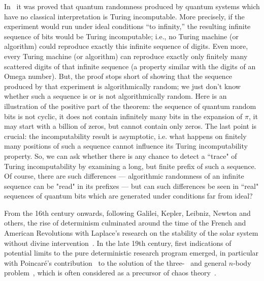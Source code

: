 \documentclass[10pt]{article}%
\begin{document}
In~\cite{2008-cal-svo} it was proved that quantum randomness produced by quantum
systems which have no classical interpretation is Turing
incomputable. More precisely, if the experiment would run under ideal
conditions ``to infinity,'' the resulting infinite sequence of bits would be
Turing incomputable; i.e., no Turing machine (or algorithm) could
reproduce exactly this infinite sequence of digits.
Even more,  every Turing machine (or algorithm) can reproduce exactly
only finitely many scattered digits of that infinite sequence (a
property similar with the digits of an Omega number). But, the
proof stops short of showing that the sequence produced by that
experiment is algorithmically random; we just don't know whether such
a sequence is or is not algorithmically random. Here is an
illustration of the positive part of the theorem: the sequence of
quantum random bits is not cyclic, it does not contain infinitely
many bits in the expansion of $\pi$, it may start with a billion of
zeros, but cannot contain only zeros.
The last point is crucial: the incomputability result is asymptotic, i.e. what happens on finitely many
positions of such a sequence cannot influence its Turing
incomputability property. So, we can ask whether there is any chance
to detect a ``trace" of Turing incomputability by examining a long,
but finite prefix of such a sequence.
Of course,  there are such differences
--- algorithmic randomness of an infinite sequence can be "read" in its
prefixes --- but  can such differences be seen in ``real"
sequences of quantum bits which are generated under conditions far
from ideal?

From the 16th century onwards, following Galilei, Kepler, Leibniz, Newton and others,
the rise of determinism culminated around the time of the French and American Revolutions
with Laplace's research on the stability of the solar system without divine intervention~\cite{frank}.
In the late 19th century, first indications of potential limits to
the pure deterministic research program emerged, in particular with Poincar{\'{e}}'s contribution~\cite{poincare14,Diacu96} to the
solution of the three-~\cite{Sundman12} and general $n$-body problem~\cite{Wang91,Wang01,Diacu96},
which is often considered as a precursor of chaos theory~\cite{eckmann1,Diacu96-ce}.
\end{document}
